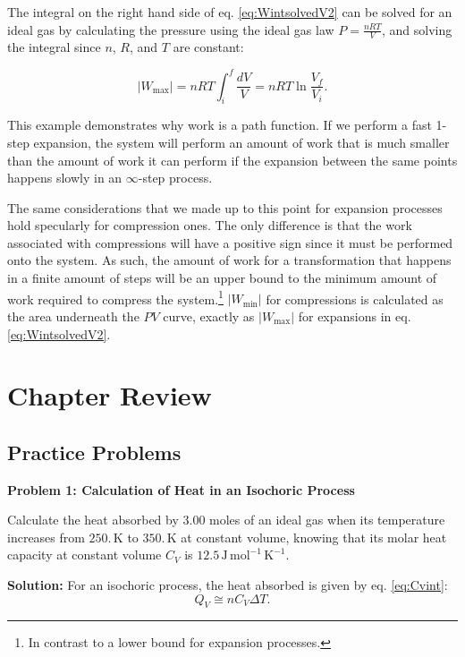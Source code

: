 \documentclass[
  9pt,
]{extbook}
\theoremstyle{definition}
\theoremstyle{definition}
\theoremstyle{definition}
\theoremstyle{definition}
\theoremstyle{remark}
\begin{document}
The integral on the right hand side of eq. \eqref{eq:WintsolvedV2} can be solved for an ideal gas by calculating the pressure using the ideal gas law \(P=\frac{nRT}{V}\), and solving the integral since \(n\), \(R\), and \(T\) are constant:

\begin{equation}
  \left| W_{\text{max}} \right| = nRT \int_{i}^{f} \frac{dV}{V} = nRT \ln \frac{V_f}{V_i}.
  \label{eq:WmaxV}
\end{equation}

This example demonstrates why work is a path function. If we perform a fast 1-step expansion, the system will perform an amount of work that is much smaller than the amount of work it can perform if the expansion between the same points happens slowly in an \(\infty\)-step process.

The same considerations that we made up to this point for expansion processes hold specularly for compression ones. The only difference is that the work associated with compressions will have a positive sign since it must be performed onto the system. As such, the amount of work for a transformation that happens in a finite amount of steps will be an upper bound to the minimum amount of work required to compress the system.\footnote{In contrast to a lower bound for expansion processes.} \(\left| W_{\text{min}} \right|\) for compressions is calculated as the area underneath the \(PV\) curve, exactly as \(\left| W_{\text{max}} \right|\) for expansions in eq. \eqref{eq:WintsolvedV2}.

\section{Chapter Review}\label{rev2}

\subsection{Practice Problems}\label{exer2}

\textbf{Problem 1: Calculation of Heat in an Isochoric Process}

Calculate the heat absorbed by 3.00 moles of an ideal gas when its temperature increases from \(250.\, \text{K}\) to \(350.\, \text{K}\) at constant volume, knowing that its molar heat capacity at constant volume \(C_V\) is \(12.5 \, \text{J} \, \text{mol}^{-1} \, \text{K}^{-1}\).

\textbf{Solution:} For an isochoric process, the heat absorbed is given by eq. \eqref{eq:Cvint}: \[Q_V \cong n C_V \Delta T.\]
\end{document}
